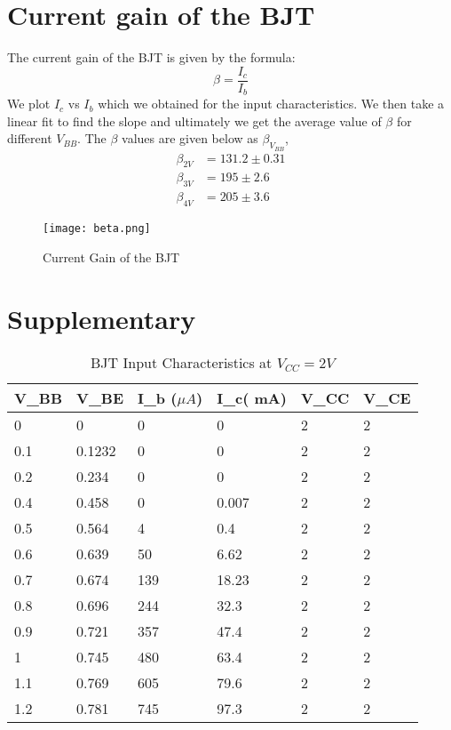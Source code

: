 \documentclass{scrartcl}
\newcommand{\1}{\mathbbm{1}}
\begin{document}
\section{Current gain of the BJT}
The current gain of the BJT is given by the formula:
\begin{equation}
        \beta = \frac{I_c}{I_b}
\end{equation}
We plot $I_c$ vs $I_b$ which we obtained for the input characteristics. We then take a linear fit to find the slope and ultimately we get the average value of $\beta$ 
for different $V_{BB}$. The $\beta$ values are given below as $\beta_{V_{BB}}$,
\begin{align}
        \beta_{2V} &= 131.2 \pm 0.31 \\
        \beta_{3V} &= 195 \pm 2.6\\
        \beta_{4V} &= 205 \pm 3.6
\end{align}
\begin{figure}
        \centering
        \texttt{[image: beta.png]}
        \caption{Current Gain of the BJT}
\end{figure}
\pagebreak
\section{Supplementary}
\label{sec:supplementary}
\begin{table}[!ht]
        \centering
        \begin{tabular}{|l|l|l|l|l|l|}
        \hline
            \textbf{V\_BB} & \textbf{V\_BE} & \textbf{I\_b ($\mu A$)} & \textbf{I\_c( mA)} & \textbf{V\_CC} & \textbf{V\_CE} \\ \hline
            0 & 0 & 0 & 0 & 2 & 2 \\ \hline
            0.1 & 0.1232 & 0 & 0 & 2 & 2 \\ \hline
            0.2 & 0.234 & 0 & 0 & 2 & 2 \\ \hline
            0.4 & 0.458 & 0 & 0.007 & 2 & 2 \\ \hline
            0.5 & 0.564 & 4 & 0.4 & 2 & 2 \\ \hline
            0.6 & 0.639 & 50 & 6.62 & 2 & 2 \\ \hline
            0.7 & 0.674 & 139 & 18.23 & 2 & 2 \\ \hline
            0.8 & 0.696 & 244 & 32.3 & 2 & 2 \\ \hline
            0.9 & 0.721 & 357 & 47.4 & 2 & 2 \\ \hline
            1 & 0.745 & 480 & 63.4 & 2 & 2 \\ \hline
            1.1 & 0.769 & 605 & 79.6 & 2 & 2 \\ \hline
            1.2 & 0.781 & 745 & 97.3 & 2 & 2 \\ \hline
        \end{tabular}
        \caption{BJT Input Characteristics at $V_{CC} = 2V$}
        \label{tab:input2v}
    \end{table}
\end{document}
